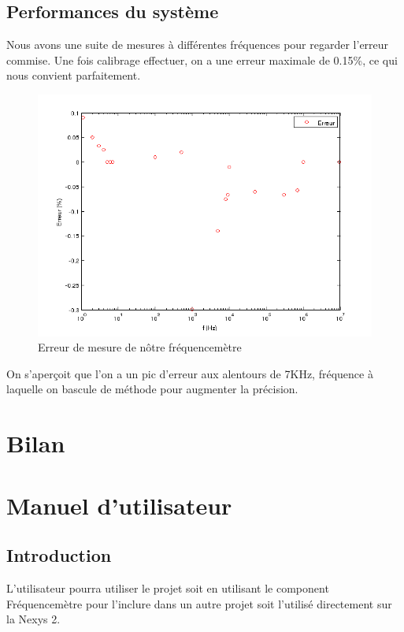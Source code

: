 \documentclass[a4paper,11pt]{article}
\begin{document}
\subsection{Performances du système}
Nous avons une suite de mesures à différentes fréquences pour regarder l'erreur commise. Une fois calibrage effectuer, on a une erreur maximale
de 0.15\%, ce qui nous convient parfaitement.  
\begin{figure}[H]
\begin{center}
	\includegraphics[scale=.7]{mesure_erreur.png}
	\caption{Erreur de mesure de nôtre fréquencemètre}
\end{center}
\end{figure}
On s'aperçoit que l'on a un pic d'erreur aux alentours de 7KHz, fréquence à laquelle on bascule de méthode pour augmenter la précision.
\newpage
\section{Bilan}

\newpage
\appendix
\section{Manuel d'utilisateur}
\subsection{Introduction}
L'utilisateur pourra utiliser le projet soit en utilisant le component Fréquencemètre pour l'inclure dans un autre projet soit l'utilisé directement sur la Nexys 2.
\end{document}
